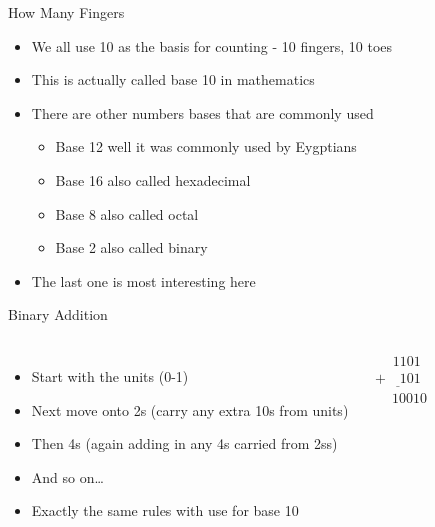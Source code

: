 \documentclass{beamer}
\begin{document}
\begin{frame}{How Many Fingers}
  \begin{itemize}
  \item
    We all use 10 as the basis for counting - 10 fingers, 10 toes
  \item
    This is actually called base 10 in mathematics
  \item
    There are other numbers bases that are commonly used
    \begin{itemize}
    \item
      Base 12 well it was commonly used by Eygptians 
    \item
      Base 16 also called hexadecimal
    \item
      Base 8 also called octal
    \item
      Base 2 also called binary
    \end{itemize}
  \item
    The last one is most interesting here
  \end{itemize}
\end{frame}


\begin{frame}{Binary Addition}
  \begin{columns}
    \begin{itemize}
    \item
      Start with the units (0-1) 
    \item
      Next move onto 2s (carry any extra 10s from units)
    \item
      Then 4s (again adding in any 4s carried from 2ss)
    \item
      And so on\dots
    \item
      Exactly the same rules with use for base 10
    \end{itemize}

    \begin{equation*}
      \begin{array}{c}
        \phantom{+9}1101\\
        \underline{+\phantom{99}101}\\
        \phantom{+}10010\\
      \end{array}
    \end{equation*}
  \end{columns}
  
\end{frame}
\end{document}
